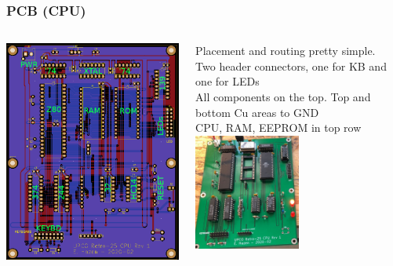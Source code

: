 \documentclass{beamer}
\newcommand{\tblue}[1]{\textcolor{my-blue}{#1}}
\newcommand{\tviolet}[1]{\textcolor{my-violet}{#1}}
\begin{document}
\begin{frame}
  \frametitle{PCB (CPU)}

  \vskip -0.2in
  \scriptsize
  \begin{columns}
    \includegraphics[width=\textwidth]{figs/cpu-board.png}
  
    Placement and routing pretty simple. \\
    Two header connectors, one for KB and one for LEDs \\
    All components on the top.
    \vskip 0.2in
    \tviolet{Top and bottom Cu areas to GND} \\
    \vskip 0.2in
    \tblue CPU, RAM, EEPROM in top row
    \vskip 0.2in
    \includegraphics[width=0.5\textwidth]{figs/cpu-board-stuffed.jpg}
\end{columns}
\end{frame}
\end{document}
